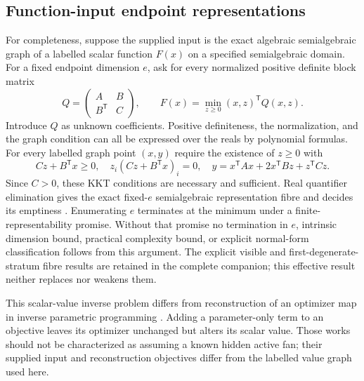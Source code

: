 \documentclass[11pt,reqno]{amsart}
\numberwithin{equation}{section}
\theoremstyle{definition}\newtheorem{definition}[theorem]{Definition}
\theoremstyle{remark}\newtheorem{remark}[theorem]{Remark}
\begin{document}
\subsection{Function-input endpoint representations}
For completeness, suppose the supplied input is the exact algebraic semialgebraic graph of a labelled scalar function $F(x)$ on a specified semialgebraic domain. For a fixed endpoint dimension $e$, ask for every normalized positive definite block matrix
\[
 Q=\begin{pmatrix}A&B\\B^{\mathsf T}&C\end{pmatrix},\qquad
 F(x)=\min_{z\ge0}(x,z)^{\mathsf T}Q(x,z).
\]
Introduce $Q$ as unknown coefficients. Positive definiteness, the normalization, and the graph condition can all be expressed over the reals by polynomial formulas. For every labelled graph point $(x,y)$ require the existence of $z\ge0$ with
\[
 Cz+B^{\mathsf T}x\ge0,\quad z_i(Cz+B^{\mathsf T}x)_i=0,\quad
 y=x^{\mathsf T}Ax+2x^{\mathsf T}Bz+z^{\mathsf T}Cz.
\]
Since $C>0$, these KKT conditions are necessary and sufficient. Real quantifier elimination gives the exact fixed-$e$ semialgebraic representation fibre and decides its emptiness \cite{BPR}. Enumerating $e$ terminates at the minimum under a finite-representability promise. Without that promise no termination in $e$, intrinsic dimension bound, practical complexity bound, or explicit normal-form classification follows from this argument. The explicit visible and first-degenerate-stratum fibre results are retained in the complete companion; this effective result neither replaces nor weakens them.

This scalar-value inverse problem differs from reconstruction of an optimizer map in inverse parametric programming \cite{HGL,NORHN}. Adding a parameter-only term to an objective leaves its optimizer unchanged but alters its scalar value. Those works should not be characterized as assuming a known hidden active fan; their supplied input and reconstruction objectives differ from the labelled value graph used here.

\appendix
\end{document}
